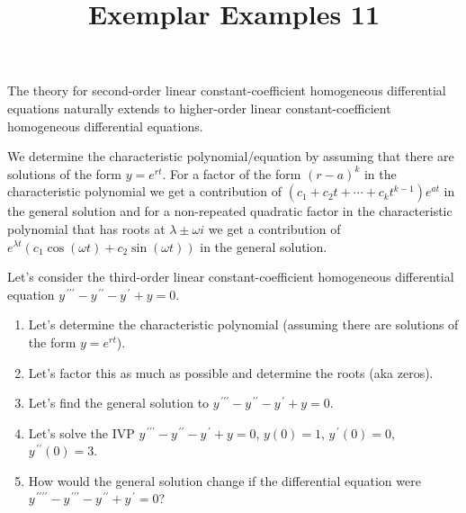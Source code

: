 \documentclass{ximera}
\begin{document}
\begin{abstract}
 \end{abstract}

    \title{Exemplar Examples 11}
    
    \maketitle

The theory for second-order linear constant-coefficient homogeneous differential equations naturally extends to higher-order linear constant-coefficient homogeneous differential equations.

We determine the characteristic polynomial/equation by assuming that there are solutions of the form $y=e^{rt}$.  For a factor of the form $(r-a)^k$ in the characteristic polynomial we get a contribution of $(c_1+c_2 t+\cdots +c_{k}t^{k-1})e^{at}$ in the general solution and for a non-repeated quadratic factor in the characteristic polynomial that has roots at $\lambda\pm \omega i$ we get a contribution of\\ $e^{\lambda t}(c_1\cos{(\omega t)}+c_2\sin{(\omega t)})$ in the general solution.

Let's consider the third-order linear constant-coefficient homogeneous differential equation $y^{\,\prime\prime\prime}-y^{\,\prime\prime}-y^{\,\prime}+y=0$.


\begin{enumerate}

\item  Let's determine the characteristic polynomial (assuming there are solutions of the form $y=e^{rt}$).



\vspace{2cm}



\item Let's factor this as much as possible and determine the roots (aka zeros).


\vfill

\item Let's find the general solution to $y^{\,\prime\prime\prime}-y^{\,\prime\prime}-y^{\,\prime}+y=0$.

\vfill

\newpage

\item Let's solve the IVP $y^{\,\prime\prime\prime}-y^{\,\prime\prime}-y^{\,\prime}+y=0$, $y(0)=1$, $y^{\,\prime}(0)=0$, $y^{\,\prime\prime}(0)=3$.

\vfill





\item How would the general solution change if the differential equation were $y^{\,\prime\prime\prime\prime}-y^{\,\prime\prime\prime}-y^{\,\prime\prime}+y^{\,\prime}=0$?


\vfill

\end{enumerate}
\end{document}
